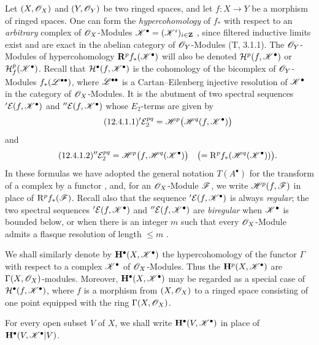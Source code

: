 \begin{env}[12.4.1]
\label{0.12.4.1}
Let $(X,\mathscr{O}_X)$ and $(Y,\mathscr{O}_Y)$ be two ringed spaces, and let
$f:X\longrightarrow Y$ be a morphism of ringed spaces.
One can form the \emph{hypercohomology} of $f_*$ with respect to an \emph{arbitrary}
complex of $\mathscr{O}_X$-Modules
$\mathscr{K}^\bullet=(\mathscr{K}^i)_{i\in\mathbf{Z}}$
, since filtered inductive limits exist and are exact in
the abelian category of $\mathscr{O}_Y$-Modules (T, 3.1.1).
The $\mathscr{O}_Y$-Modules of hypercohomology
$\mathbf{R}^p f_*(\mathscr{K}^\bullet)$ will also be denoted
$\mathcal{H}^p(f,\mathscr{K}^\bullet)$ or
$\mathcal{H}^p_f(\mathscr{K}^\bullet)$.
Recall that $\mathcal{H}^\bullet(f,\mathscr{K}^\bullet)$ is the cohomology of
the bicomplex of $\mathscr{O}_Y$-Modules $f_*(\mathscr{L}^{\bullet\bullet})$,
where $\mathscr{L}^{\bullet\bullet}$ is a Cartan--Eilenberg injective
resolution of $\mathscr{K}^\bullet$ in the category of
$\mathscr{O}_X$-Modules.
It is the abutment of two spectral sequences
${}'\mathcal E(f,\mathscr{K}^\bullet)$ and ${}''\mathcal E(f,\mathscr{K}^\bullet)$ whose $E_2$-terms are
given by
\begin{equation}
\label{0.12.4.1.1}
\tag{12.4.1.1}
  {}'\mathcal E_2^{pq}
  =\mathscr{H}^p\bigl(\mathscr{H}^q(f,\mathscr{K}^\bullet)\bigr)
\end{equation}
and
\begin{equation}
\label{0.12.4.1.2}
\tag{12.4.1.2}
  {}''\mathcal E_2^{pq}
  =\mathscr{H}^p\bigl(f,\mathscr{H}^q(\mathscr{K}^\bullet)\bigr)
  \quad
  \bigl(=\mathrm{R}^p f_*(\mathscr{H}^q(\mathscr{K}^\bullet))\bigr).
\end{equation}
In these formulas we have adopted the general notation $T(A^\bullet)$
for the transform of a complex by a functor , and, for
an $\mathscr{O}_X$-Module $\mathscr{F}$, we write
$\mathscr{H}^p(f,\mathscr{F})$ in place of $\mathrm{R}^p f_*(\mathscr{F})$.
Recall also that the sequence ${}'\mathcal E(f,\mathscr{K}^\bullet)$ is always \emph{regular};
the two spectral sequences ${}'\mathcal E(f,\mathscr{K}^\bullet)$ and
${}''\mathcal E(f,\mathscr{K}^\bullet)$ are \emph{biregular} when $\mathscr{K}^\bullet$ is
bounded below,
or when there is an integer $m$ such that every $\mathscr{O}_X$-Module
admits a flasque resolution of length $\leq m$ .
\end{env}

\begin{env}[12.4.2]
\label{0.12.4.2}
We shall similarly denote by $\mathbf{H}^\bullet(X,\mathscr{K}^\bullet)$ the
hypercohomology of the functor $\Gamma$ with respect to a complex
$\mathscr{K}^\bullet$ of $\mathscr{O}_X$-Modules.
Thus the $\mathbf{H}^p(X,\mathscr{K}^\bullet)$ are
$\Gamma(X,\mathscr{O}_X)$-modules.
Moreover, $\mathbf{H}^\bullet(X,\mathscr{K}^\bullet)$ may be regarded as a
special case of $\mathcal{H}^\bullet(f,\mathscr{K}^\bullet)$, where $f$ is a
morphism from $(X,\mathscr{O}_X)$ to a ringed space consisting of one point
equipped with the ring $\Gamma(X,\mathscr{O}_X)$.

For every open subset $V$ of $X$, we shall write
$\mathbf{H}^\bullet(V,\mathscr{K}^\bullet)$ in place of
$\mathbf{H}^\bullet(V,\mathscr{K}^\bullet|V)$.
\end{env}

